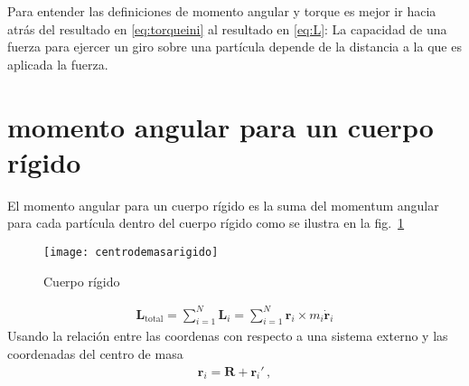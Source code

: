 Para entender las definiciones de momento angular y torque es mejor
ir hacia atrás del resultado en \eqref{eq:torqueini} al resultado en
\eqref{eq:L}: La capacidad de una fuerza para ejercer un giro sobre
una partícula depende de la distancia a la que es aplicada la fuerza.

\section{momento angular para un cuerpo rígido}


El momento angular para un cuerpo rígido es la suma del momentum
angular para cada partícula dentro del cuerpo rígido como se ilustra
en la fig.~\ref{fig:centrodemasarigido}

\begin{frame}
\begin{figure}
  \centering
  \texttt{[image: centrodemasarigido]}
  \caption{Cuerpo rígido}
  \label{fig:centrodemasarigido}
\end{figure}
\end{frame}
\begin{align}
  \mathbf{L}_{\text{total}}=\sum_{i=1}^N\mathbf{L}_i=\sum_{i=1}^N \mathbf{r}_i\times m_i\dot{\mathbf{r}}_i
\end{align}
Usando la relación entre las coordenas con respecto a una sistema
externo y las coordenadas del centro de masa
\begin{align}
  \mathbf{r}_i=\mathbf{R}+\mathbf{r}_i'\,,
\end{align}


